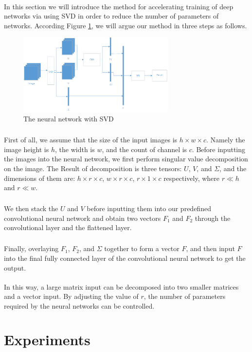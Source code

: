 \documentclass[12pt,a4paper]{article}
\begin{document}
\paragraph{} In this section we will introduce the method for accelerating training of deep networks via using SVD in order to reduce the number of parameters of networks. According Figure \ref{Fig.model}, we will argue our method in three steps as follows.
	\begin{figure}[H]
		\centering
		\includegraphics[width=0.7\textwidth]{../images/svd-cnn-arch.png}
		\caption{The neural network with SVD}
		\label{Fig.model}
	\end{figure}
	\subparagraph{} First of all, we assume that the size of the input images is $h\times w \times c$. Namely the image height is $h$, the width is $w$, and the count of channel is $c$. Before inputting the images into the neural network, we first perform singular value decomposition on the image. The Result of decomposition is three tensors: $U$, $V$, and $\Sigma$, and the dimensions of them are: $h\times r \times c$, $w \times r \times c$, $r\times 1 \times c$ respectively, where $r \ll h$ and $r \ll w$.
	\subparagraph{} We then stack the $U$ and $V$ before inputting them into our predefined convolutional neural network and obtain two vectors $F_1$ and $F_2$ through the convolutional layer and the flattened layer.
	\subparagraph{} Finally, overlaying $F_1$, $F_2$, and $\Sigma$ together to form a vector $F$, and then input $F$ into the final fully connected layer of the convolutional neural network to get the output.
\paragraph{} In this way, a large matrix input can be decomposed into two smaller matrices and a vector input. By adjusting the value of $r$, the number of parameters required by the neural networks can be controlled.

\section{Experiments}
\end{document}
